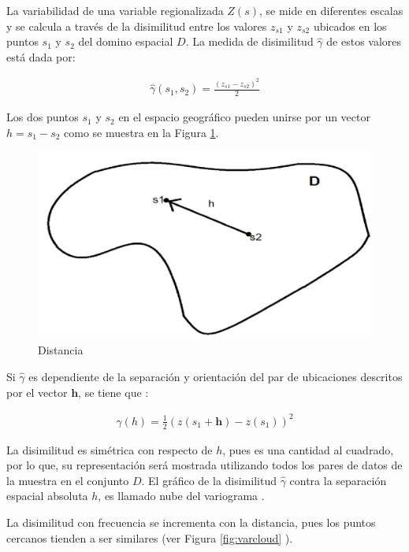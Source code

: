 \documentclass[
]{book}
\begin{document}
La variabilidad de una variable regionalizada \(Z(s)\), se mide en diferentes escalas y se calcula a través de la disimilitud entre los valores \(z_{s1}\) y \(z_{s2}\) ubicados en los puntos \(s_1\) y \(s_2\) del domino espacial \(D\). La medida de disimilitud \(\hat{\gamma}\) de estos valores está dada por:

\begin{align*}
  \hat{\gamma}(s_1,s_2)=\frac{(z_{s1}-z_{s2})^2}{2}  
\end{align*}

Los dos puntos \(s_1\) y \(s_2\) en el espacio geográfico pueden unirse por un vector \(h=s_1-s_2\) como se muestra en la Figura \ref{fig:distanciah}.

\begin{figure}
\includegraphics[width=17.78in]{figuras/otros/distancia_h} \caption{Distancia}\label{fig:distanciah}
\end{figure}

Si \(\hat{\gamma}\) es dependiente de la separación y orientación del par de ubicaciones descritos por el vector \(\textbf{h}\), se tiene que \citep{hans}:

\begin{align*}
  \hat{\gamma}(h)=\frac{1}{2}(z(s_1+\textbf{h})-z(s_1))^2  
\end{align*}

La disimilitud es simétrica con respecto de \(h\), pues es una cantidad al cuadrado, por lo que, su representación será mostrada utilizando todos los pares de datos de la muestra en el conjunto \(D\). El gráfico de la disimilitud \(\hat{\gamma}\) contra la separación espacial absoluta \(h\), es llamado nube del variograma \citep{hans}.

La disimilitud con frecuencia se incrementa con la distancia, pues los puntos cercanos tienden a ser similares \citep{hans} (ver Figura \ref{fig:varcloud} ).
\end{document}
